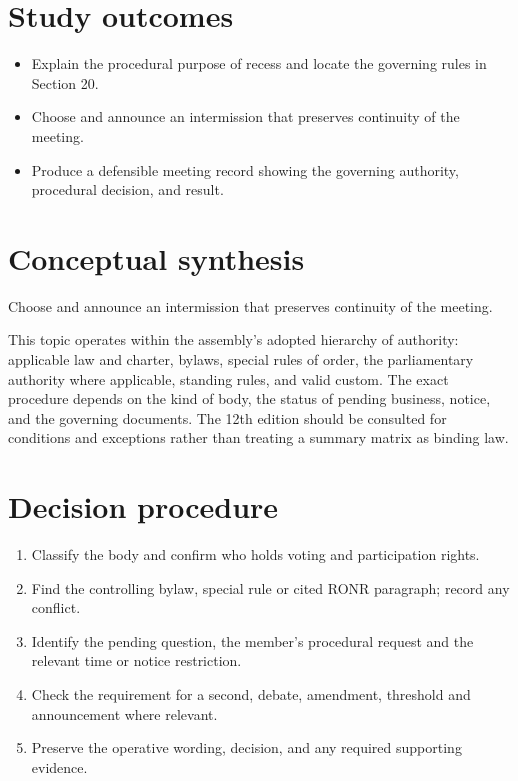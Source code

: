 \documentclass[11pt]{article}
\begin{document}
\SuiteOpen
{}
\section{Study outcomes}
\begin{itemize}[leftmargin=*,itemsep=4pt]
\item Explain the procedural purpose of recess and locate the governing rules in Section 20.
\item Choose and announce an intermission that preserves continuity of the meeting.
\item Produce a defensible meeting record showing the governing authority, procedural decision, and result.
\end{itemize}

\section{Conceptual synthesis}
Choose and announce an intermission that preserves continuity of the meeting.

This topic operates within the assembly’s adopted hierarchy of authority: applicable law and charter, bylaws, special rules of order, the parliamentary authority where applicable, standing rules, and valid custom. The exact procedure depends on the kind of body, the status of pending business, notice, and the governing documents. The 12th edition should be consulted for conditions and exceptions rather than treating a summary matrix as binding law.
\section{Decision procedure}
\begin{enumerate}[leftmargin=*,itemsep=4pt]
\item Classify the body and confirm who holds voting and participation rights.
\item Find the controlling bylaw, special rule or cited RONR paragraph; record any conflict.
\item Identify the pending question, the member’s procedural request and the relevant time or notice restriction.
\item Check the requirement for a second, debate, amendment, threshold and announcement where relevant.
\item Preserve the operative wording, decision, and any required supporting evidence.
\end{enumerate}
\end{document}
